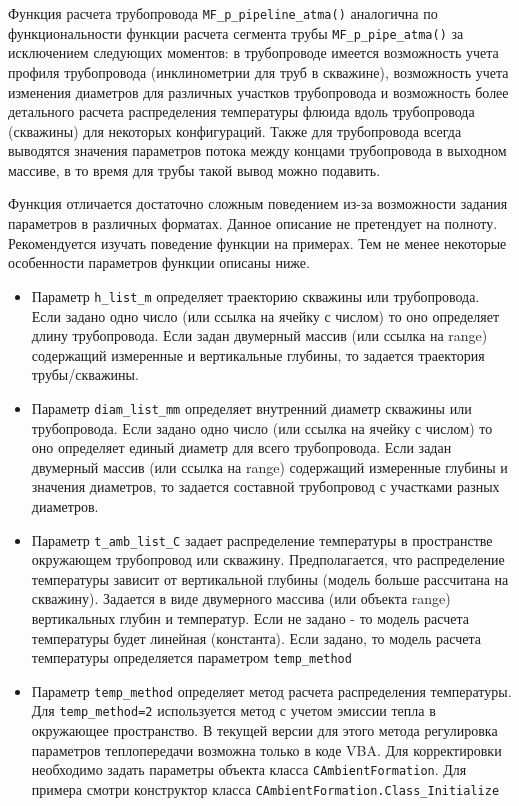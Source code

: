 Функция расчета трубопровода \texttt{MF_p_pipeline_atma()} аналогична по функциональности функции расчета сегмента трубы \texttt{MF_p_pipe_atma()} за исключением следующих моментов: в трубопроводе имеется возможность учета профиля трубопровода (инклинометрии для труб в скважине), возможность учета изменения диаметров для различных участков трубопровода и возможность более детального расчета распределения температуры флюида вдоль трубопровода (скважины) для некоторых конфигураций. Также для трубопровода всегда выводятся значения параметров потока между концами трубопровода в выходном массиве, в то время для трубы такой вывод можно подавить.

Функция отличается достаточно сложным поведением из-за возможности задания параметров в различных форматах. Данное описание не претендует на полноту. Рекомендуется изучать поведение функции на примерах. Тем не менее некоторые особенности параметров функции описаны ниже.

\begin{itemize}
	\item Параметр 	\texttt{h_list_m} определяет траекторию скважины или трубопровода. Если задано одно число (или ссылка на ячейку с числом) то оно определяет длину трубопровода. Если задан двумерный массив (или ссылка на range) содержащий измеренные и вертикальные глубины, то задается траектория трубы/скважины. 
	\item Параметр 	\texttt{diam_list_mm} определяет внутренний диаметр скважины или трубопровода. Если задано одно число (или ссылка на ячейку с числом) то оно определяет единый диаметр для всего трубопровода. Если задан двумерный массив (или ссылка на range) содержащий измеренные глубины и значения диаметров, то задается составной трубопровод с участками разных диаметров. 
	\item Параметр \texttt{t_amb_list_C} задает распределение температуры в пространстве окружающем трубопровод или скважину. Предполагается, что распределение температуры зависит от вертикальной глубины (модель больше рассчитана на скважину). Задается в виде двумерного массива (или объекта range) вертикальных глубин и температур. Если не задано - то модель расчета температуры будет линейная (константа). Если задано, то модель расчета температуры определяется параметром \texttt{temp_method}
	\item Параметр \texttt{temp_method} определяет метод расчета распределения температуры. Для \texttt{temp_method=2} используется метод с учетом эмиссии тепла в окружающее пространство. В текущей версии \unf{} для этого метода регулировка параметров теплопередачи возможна только в коде VBA. Для корректировки необходимо задать параметры объекта класса  \texttt{CAmbientFormation}. Для примера смотри конструктор класса  \texttt{CAmbientFormation.Class_Initialize}
	
\end{itemize}


